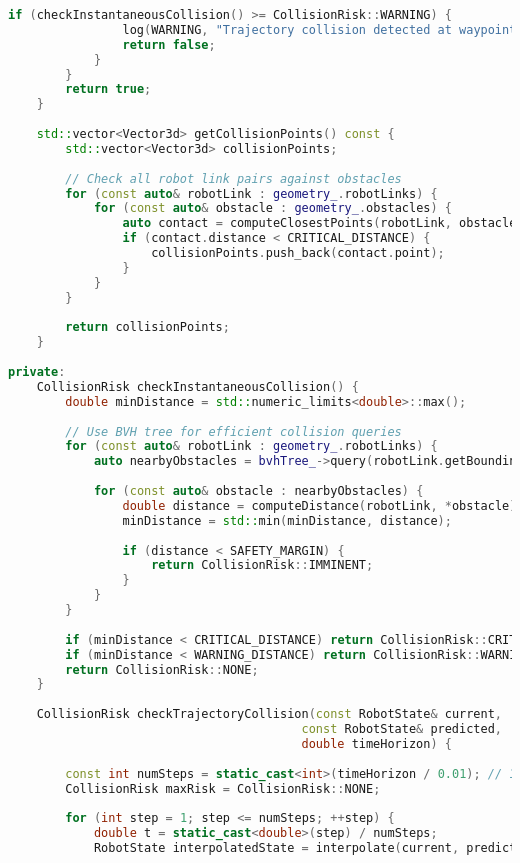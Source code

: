 \begin{lstlisting}[language=C++, caption=Advanced Collision Detection System]
            if (checkInstantaneousCollision() >= CollisionRisk::WARNING) {
                log(WARNING, "Trajectory collision detected at waypoint " + std::to_string(i));
                return false;
            }
        }
        return true;
    }
    
    std::vector<Vector3d> getCollisionPoints() const {
        std::vector<Vector3d> collisionPoints;
        
        // Check all robot link pairs against obstacles
        for (const auto& robotLink : geometry_.robotLinks) {
            for (const auto& obstacle : geometry_.obstacles) {
                auto contact = computeClosestPoints(robotLink, obstacle);
                if (contact.distance < CRITICAL_DISTANCE) {
                    collisionPoints.push_back(contact.point);
                }
            }
        }
        
        return collisionPoints;
    }
    
private:
    CollisionRisk checkInstantaneousCollision() {
        double minDistance = std::numeric_limits<double>::max();
        
        // Use BVH tree for efficient collision queries
        for (const auto& robotLink : geometry_.robotLinks) {
            auto nearbyObstacles = bvhTree_->query(robotLink.getBoundingBox());
            
            for (const auto& obstacle : nearbyObstacles) {
                double distance = computeDistance(robotLink, *obstacle);
                minDistance = std::min(minDistance, distance);
                
                if (distance < SAFETY_MARGIN) {
                    return CollisionRisk::IMMINENT;
                }
            }
        }
        
        if (minDistance < CRITICAL_DISTANCE) return CollisionRisk::CRITICAL;
        if (minDistance < WARNING_DISTANCE) return CollisionRisk::WARNING;
        return CollisionRisk::NONE;
    }
    
    CollisionRisk checkTrajectoryCollision(const RobotState& current,
                                         const RobotState& predicted,
                                         double timeHorizon) {
        
        const int numSteps = static_cast<int>(timeHorizon / 0.01); // 10ms steps
        CollisionRisk maxRisk = CollisionRisk::NONE;
        
        for (int step = 1; step <= numSteps; ++step) {
            double t = static_cast<double>(step) / numSteps;
            RobotState interpolatedState = interpolate(current, predicted, t);
            

\end{lstlisting}
